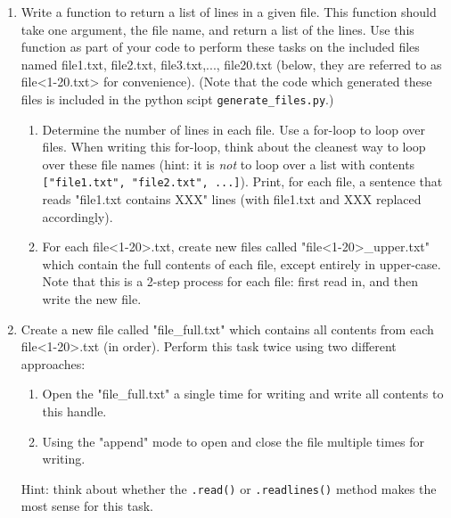 \documentclass{article}[12pt]
\newcommand{\code}[1]{\texttt{#1}}  %
\begin{document}
\begin{enumerate}[itemsep=5ex]
	\item Write a function to return a list of lines in a given file. This function should take one argument, the file name, and return a list of the lines. Use this function as part of your code to perform these tasks on the included files named file1.txt, file2.txt, file3.txt,..., file20.txt (below, they are referred to as file<1-20.txt> for convenience). (Note that the code which generated these files is included in the python scipt \code{generate\_files.py}.)
		\begin{enumerate}[itemsep=2ex]
			\item Determine the number of lines in each file. Use a for-loop to loop over files. When writing this for-loop, think about the cleanest way to loop over these file names (hint: it is \emph{not} to loop over a list with contents \code{["file1.txt", "file2.txt", ...]}). Print, for each file, a sentence that reads "file1.txt contains XXX" lines (with file1.txt and XXX replaced accordingly).
			\item For each file<1-20>.txt, create new files called "file<1-20>\_upper.txt" which contain the full contents of each file, except entirely in upper-case. Note that this is a 2-step process for each file: first read in, and then write the new file. 
		\end{enumerate}
	
		\item Create a new file called "file\_full.txt" which contains all contents from each file<1-20>.txt (in order). Perform this task twice using two different approaches:

		\begin{enumerate}[itemsep=2ex]
			\item Open the "file\_full.txt" a single time for writing and write all contents to this handle.
			\item Using the "append" mode to open and close the file multiple times for writing.
		\end{enumerate}
		Hint: think about whether the \code{.read()} or \code{.readlines()} method makes the most sense for this task.
	

\end{enumerate}
\end{document}

